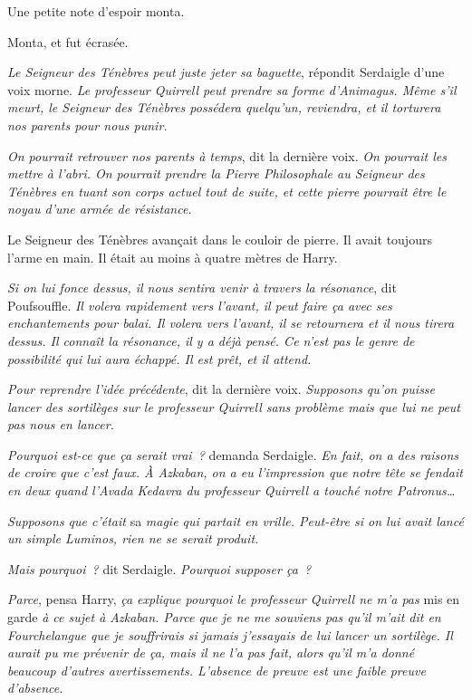 Une petite note d'espoir monta.

Monta, et fut écrasée.

\emph{Le Seigneur des Ténèbres peut juste jeter sa baguette}, répondit Serdaigle d'une voix morne. \emph{Le professeur Quirrell peut prendre sa forme d'Animagus. Même s'il meurt, le Seigneur des Ténèbres possédera quelqu'un, reviendra, et il torturera nos parents pour nous punir.}

\emph{On pourrait retrouver nos parents à temps}, dit la dernière voix. \emph{On pourrait les mettre à l'abri. On pourrait prendre la Pierre Philosophale au Seigneur des Ténèbres en tuant son corps actuel tout de suite, et cette pierre pourrait être le noyau d'une armée de résistance.}

Le Seigneur des Ténèbres avançait dans le couloir de pierre. Il avait toujours l'arme en main. Il était au moins à quatre mètres de Harry.

\emph{Si on lui fonce dessus, il nous sentira venir à travers la résonance}, dit Poufsouffle. \emph{Il volera rapidement vers l'avant, il peut faire ça avec ses enchantements pour balai. Il volera vers l'avant, il se retournera et il nous tirera dessus. Il connaît la résonance, il y a déjà pensé. Ce n'est pas le genre de possibilité qui lui aura échappé. Il est prêt, et il attend.}

\emph{Pour reprendre l'idée précédente}, dit la dernière voix. \emph{Supposons qu'on puisse lancer des sortilèges sur le professeur Quirrell sans problème mais que lui ne peut pas nous en lancer.}

\emph{Pourquoi est-ce que ça serait vrai~?} demanda Serdaigle. \emph{En fait, on a des raisons de croire que c'est faux. À Azkaban, on a eu l'impression que notre tête se fendait en deux quand l'Avada Kedavra du professeur Quirrell a touché notre Patronus…}

\emph{Supposons que c'était} sa \emph{magie qui partait en vrille. Peut-être si on lui avait lancé un simple Luminos, rien ne se serait produit.}

\emph{Mais pourquoi~?} dit Serdaigle. \emph{Pourquoi supposer ça~?}

\emph{Parce}, pensa Harry, \emph{ça explique pourquoi le professeur Quirrell ne m'a pas} mis en garde \emph{à ce sujet à Azkaban. Parce que je ne me souviens pas qu'il m'ait dit en Fourchelangue que je souffrirais si jamais j'essayais de lui lancer un sortilège. Il aurait pu me prévenir de ça, mais il ne l'a pas fait, alors qu'il m'a donné beaucoup d'autres avertissements. L'absence de preuve est une faible preuve d'absence.}

